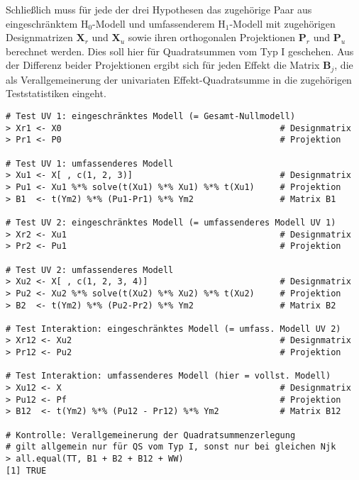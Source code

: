 Schließlich muss für jede der drei Hypothesen das zugehörige Paar aus eingeschränktem $\text{H}_{0}$-Modell und umfassenderem $\text{H}_{1}$-Modell mit zugehörigen Designmatrizen $\bm{X}_{r}$ und $\bm{X}_{u}$ sowie ihren orthogonalen Projektionen $\bm{P}_{r}$ und $\bm{P}_{u}$ berechnet werden. Dies soll hier für Quadratsummen vom Typ I geschehen. Aus der Differenz beider Projektionen ergibt sich für jeden Effekt die Matrix $\bm{B}_{j}$, die als Verallgemeinerung der univariaten Effekt-Quadratsumme in die zugehörigen Teststatistiken eingeht.
\begin{lstlisting}
# Test UV 1: eingeschränktes Modell (= Gesamt-Nullmodell)
> Xr1 <- X0                                           # Designmatrix
> Pr1 <- P0                                           # Projektion

# Test UV 1: umfassenderes Modell
> Xu1 <- X[ , c(1, 2, 3)]                             # Designmatrix
> Pu1 <- Xu1 %*% solve(t(Xu1) %*% Xu1) %*% t(Xu1)     # Projektion
> B1  <- t(Ym2) %*% (Pu1-Pr1) %*% Ym2                 # Matrix B1

# Test UV 2: eingeschränktes Modell (= umfassenderes Modell UV 1)
> Xr2 <- Xu1                                          # Designmatrix
> Pr2 <- Pu1                                          # Projektion

# Test UV 2: umfassenderes Modell
> Xu2 <- X[ , c(1, 2, 3, 4)]                          # Designmatrix
> Pu2 <- Xu2 %*% solve(t(Xu2) %*% Xu2) %*% t(Xu2)     # Projektion
> B2  <- t(Ym2) %*% (Pu2-Pr2) %*% Ym2                 # Matrix B2

# Test Interaktion: eingeschränktes Modell (= umfass. Modell UV 2)
> Xr12 <- Xu2                                         # Designmatrix
> Pr12 <- Pu2                                         # Projektion

# Test Interaktion: umfassenderes Modell (hier = vollst. Modell)
> Xu12 <- X                                           # Designmatrix
> Pu12 <- Pf                                          # Projektion
> B12  <- t(Ym2) %*% (Pu12 - Pr12) %*% Ym2            # Matrix B12

# Kontrolle: Verallgemeinerung der Quadratsummenzerlegung
# gilt allgemein nur für QS vom Typ I, sonst nur bei gleichen Njk
> all.equal(TT, B1 + B2 + B12 + WW)
[1] TRUE
\end{lstlisting}

